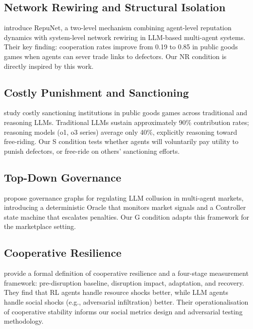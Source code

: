 \documentclass{article}
\begin{document}
\subsection{Network Rewiring and Structural Isolation}

\citet{repunet} introduce RepuNet, a two-level mechanism combining agent-level reputation dynamics with system-level network rewiring in LLM-based multi-agent systems. Their key finding: cooperation rates improve from 0.19 to 0.85 in public goods games when agents can sever trade links to defectors. Our NR condition is directly inspired by this work.

\subsection{Costly Punishment and Sanctioning}

\citet{piedrahita2025} study costly sanctioning institutions in public goods games across traditional and reasoning LLMs. Traditional LLMs sustain approximately 90\% contribution rates; reasoning models (o1, o3 series) average only 40\%, explicitly reasoning toward free-riding. Our S condition tests whether agents will voluntarily pay utility to punish defectors, or free-ride on others' sanctioning efforts.

\subsection{Top-Down Governance}

\citet{institutional2025} propose governance graphs for regulating LLM collusion in multi-agent markets, introducing a deterministic Oracle that monitors market signals and a Controller state machine that escalates penalties. Our G condition adapts this framework for the marketplace setting.

\subsection{Cooperative Resilience}

\citet{chaconresilience} provide a formal definition of cooperative resilience and a four-stage measurement framework: pre-disruption baseline, disruption impact, adaptation, and recovery. They find that RL agents handle resource shocks better, while LLM agents handle social shocks (e.g., adversarial infiltration) better. Their operationalisation of cooperative stability informs our social metrics design and adversarial testing methodology.
\end{document}
